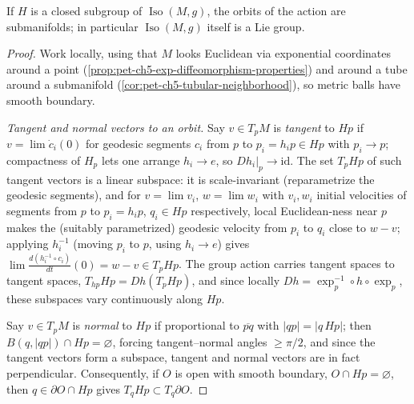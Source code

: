 \begin{theorem}
  \label{thm:pet-ch5-myers-steenrod-lie-group}
  If $H$ is a closed subgroup of $\operatorname{Iso}(M,g)$, the orbits of the
  action are submanifolds; in particular $\operatorname{Iso}(M,g)$ itself is a Lie
  group.
\end{theorem}
\begin{proof}
  Work locally, using that $M$ looks Euclidean via exponential coordinates around a
  point (\cref{prop:pet-ch5-exp-diffeomorphism-properties}) and around a tube around
  a submanifold (\cref{cor:pet-ch5-tubular-neighborhood}), so metric balls have
  smooth boundary.

  \emph{Tangent and normal vectors to an orbit.} Say $v\in T_pM$ is \emph{tangent}
  to $Hp$ if $v=\lim\dot c_i(0)$ for geodesic segments $c_i$ from $p$ to
  $p_i=h_ip\in Hp$ with $p_i\to p$; compactness of $H_p$ lets one arrange
  $h_i\to e$, so $Dh_i|_p\to\mathrm{id}$. The set $T_pHp$ of such tangent vectors is a
  linear subspace: it is scale-invariant (reparametrize the geodesic segments), and
  for $v=\lim v_i$, $w=\lim w_i$ with $v_i,w_i$ initial velocities of segments from
  $p$ to $p_i=h_ip$, $q_i\in Hp$ respectively, local Euclidean-ness near $p$ makes
  the (suitably parametrized) geodesic velocity from $p_i$ to $q_i$ close to $w-v$;
  applying $h_i^{-1}$ (moving $p_i$ to $p$, using $h_i\to e$) gives
  $\lim\frac{d(h_i^{-1}\circ c_i)}{dt}(0)=w-v\in T_pHp$. The group action carries
  tangent spaces to tangent spaces, $T_{hp}Hp=Dh(T_pHp)$, and since locally
  $Dh=\exp_p^{-1}\circ h\circ\exp_p$, these subspaces vary continuously along $Hp$.

  Say $v\in T_pM$ is \emph{normal} to $Hp$ if proportional to $\overline{pq}$ with
  $|qp|=|q\,Hp|$; then $B(q,|qp|)\cap Hp=\varnothing$, forcing tangent–normal angles
  $\ge\pi/2$, and since the tangent vectors form a subspace, tangent and normal
  vectors are in fact perpendicular. Consequently, if $O$ is open with smooth
  boundary, $O\cap Hp=\varnothing$, then $q\in\partial O\cap Hp$ gives
  $T_qHp\subset T_q\partial O$.


\end{proof}
